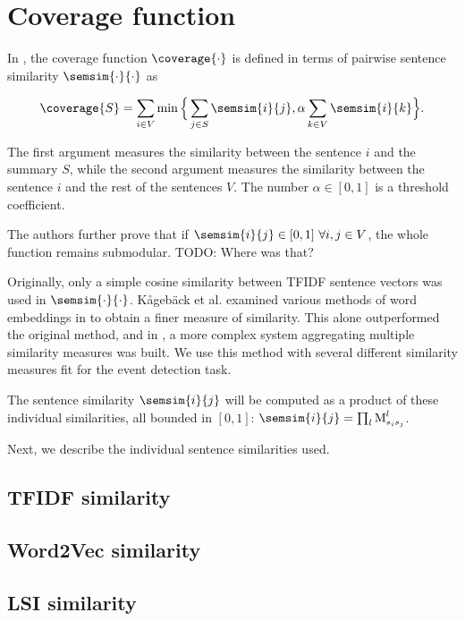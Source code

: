 \section{Coverage function}

In \cite{multi-summarization-2}, the coverage function $\coverage{\cdot}$ is defined in terms of pairwise sentence similarity $\semsim{\cdot}{\cdot}$ as

\begin{equation}
\coverage{S} = \sum_{i \in V}{\min{\Big\{ \sum_{j \in S}{\semsim{i}{j}}, \alpha \sum_{k \in V}{\semsim{i}{k}} \Big\} }}.
\end{equation}

The first argument measures the similarity between the sentence $i$ and the summary $S$, while the second argument measures the similarity between the sentence $i$ and the rest of the sentences $V$. The number $\alpha \in [0,1]$ is a threshold coefficient.

The authors further prove that if $\semsim{i}{j} \in [0,1]\ \forall i, j \in V$, the whole function remains submodular. {\color{red} TODO: Where was that?}

Originally, only a simple cosine similarity between TFIDF sentence vectors \cite{information-retrieval} was used in $\semsim{\cdot}{\cdot}$. Kågebäck et al. examined various methods of word embeddings in \cite{mogren-1} to obtain a finer measure of similarity. This alone outperformed the original method, and in \cite{mogren-2}, a more complex system aggregating multiple similarity measures was built. We use this method with several different similarity measures fit for the event detection task.

The sentence similarity $\semsim{i}{j}$ will be computed as a product of these individual similarities, all bounded in $[0, 1]$: $\semsim{i}{j} = \prod_{l}{\similarity_{s_{i}s_{j}}^{l}}$.

Next, we describe the individual sentence similarities used.

\subsection{TFIDF similarity}

\subsection{Word2Vec similarity}

\subsection{LSI similarity}

